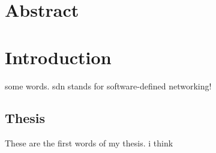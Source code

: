 \documentclass[pdftex,12pt,a4paper]{report}
\begin{document}


\chapter*{Abstract}


\chapter{Introduction}

some words. sdn stands for software-defined networking!

\section{Thesis}
These are the first words of my thesis. i think
\end{document}
